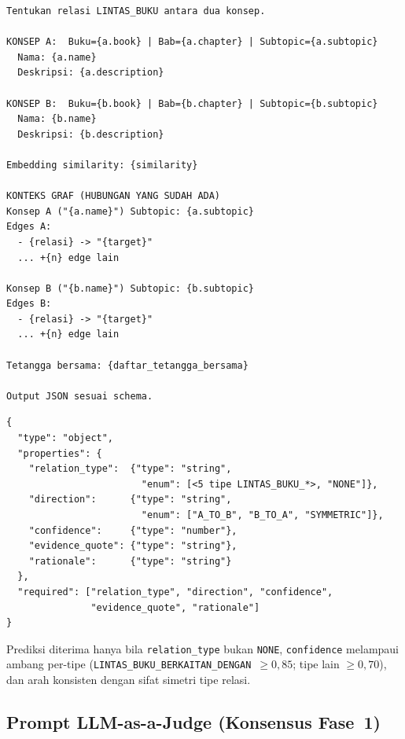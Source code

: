 \documentclass[../../thesis]{subfiles}
\begin{document}
\begin{lstlisting}[style=promptbox,caption={User prompt klasifikasi relasi (Pass-2). Blok \texttt{KONTEKS GRAF} memuat subtopik, hingga lima edge keluar tiap konsep, dan tetangga bersama.},label={lst:prompt-user}]
Tentukan relasi LINTAS_BUKU antara dua konsep.

KONSEP A:  Buku={a.book} | Bab={a.chapter} | Subtopic={a.subtopic}
  Nama: {a.name}
  Deskripsi: {a.description}

KONSEP B:  Buku={b.book} | Bab={b.chapter} | Subtopic={b.subtopic}
  Nama: {b.name}
  Deskripsi: {b.description}

Embedding similarity: {similarity}

KONTEKS GRAF (HUBUNGAN YANG SUDAH ADA)
Konsep A ("{a.name}") Subtopic: {a.subtopic}
Edges A:
  - {relasi} -> "{target}"
  ... +{n} edge lain

Konsep B ("{b.name}") Subtopic: {b.subtopic}
Edges B:
  - {relasi} -> "{target}"
  ... +{n} edge lain

Tetangga bersama: {daftar_tetangga_bersama}

Output JSON sesuai schema.
\end{lstlisting}

\begin{lstlisting}[style=promptbox,caption={Skema respons JSON yang dipaksakan pada keluaran model (Pass-2).},label={lst:prompt-schema}]
{
  "type": "object",
  "properties": {
    "relation_type":  {"type": "string",
                        "enum": [<5 tipe LINTAS_BUKU_*>, "NONE"]},
    "direction":      {"type": "string",
                        "enum": ["A_TO_B", "B_TO_A", "SYMMETRIC"]},
    "confidence":     {"type": "number"},
    "evidence_quote": {"type": "string"},
    "rationale":      {"type": "string"}
  },
  "required": ["relation_type", "direction", "confidence",
               "evidence_quote", "rationale"]
}
\end{lstlisting}

\noindent Prediksi diterima hanya bila \texttt{relation\_type} bukan
\texttt{NONE}, \texttt{confidence} melampaui ambang per-tipe
(\texttt{LINTAS\_BUKU\_BERKAITAN\_DENGAN}~$\geq 0{,}85$; tipe lain
$\geq 0{,}70$), dan arah konsisten dengan sifat simetri tipe relasi.

\subsection{Prompt LLM-as-a-Judge (Konsensus Fase~1)}
\label{lamp:prompt-judge}
\end{document}
